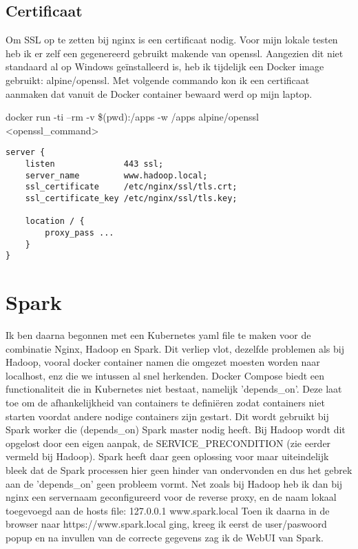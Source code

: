 \subsection{Certificaat}

Om SSL op te zetten bij nginx is een certificaat nodig. Voor mijn lokale testen heb ik er zelf een gegenereerd gebruikt makende van openssl. Aangezien dit niet standaard al op Windows geïnstalleerd is, heb ik tijdelijk een Docker image gebruikt: alpine/openssl.
\newline
\newline
Met volgende commando kon ik een certificaat aanmaken dat vanuit de Docker container bewaard werd op mijn laptop.
\newline
\newline

docker run -ti --rm -v \$(pwd):/apps -w /apps alpine/openssl <openssl\_command>

\begin{lstlisting}
server {
    listen              443 ssl;
    server_name         www.hadoop.local;
    ssl_certificate     /etc/nginx/ssl/tls.crt;
    ssl_certificate_key /etc/nginx/ssl/tls.key;
    
    location / {
        proxy_pass ...
    }
}
\end{lstlisting}

\section{Spark}

Ik ben daarna begonnen met een Kubernetes yaml file te maken voor de combinatie Nginx, Hadoop en Spark. Dit verliep vlot, dezelfde problemen als bij Hadoop, vooral docker container namen die omgezet moesten worden naar localhost, enz die we intussen al snel herkenden.
\newline
\newline
Docker Compose biedt een functionaliteit die in Kubernetes niet bestaat, namelijk 'depends\_on'. Deze laat toe om de afhankelijkheid van containers te definiëren zodat containers niet starten voordat andere nodige containers zijn gestart. Dit wordt gebruikt bij Spark worker die (depends\_on) Spark master nodig heeft.
Bij Hadoop wordt dit opgelost door een eigen aanpak, de SERVICE\_PRECONDITION (zie eerder vermeld bij Hadoop).
\newline
\newline
Spark heeft daar geen oplossing voor maar uiteindelijk bleek dat de Spark processen hier geen hinder van ondervonden en dus het gebrek aan de 'depends\_on' geen probleem vormt.
\newline
\newline
Net zoals bij Hadoop heb ik dan bij nginx een servernaam geconfigureerd voor de reverse proxy, en de naam lokaal toegevoegd aan de hosts file:
127.0.0.1 www.spark.local
\newline
\newline
Toen ik daarna in de browser naar https://www.spark.local ging, kreeg ik eerst de user/paswoord popup en na invullen van de correcte gegevens zag ik de WebUI van Spark.

